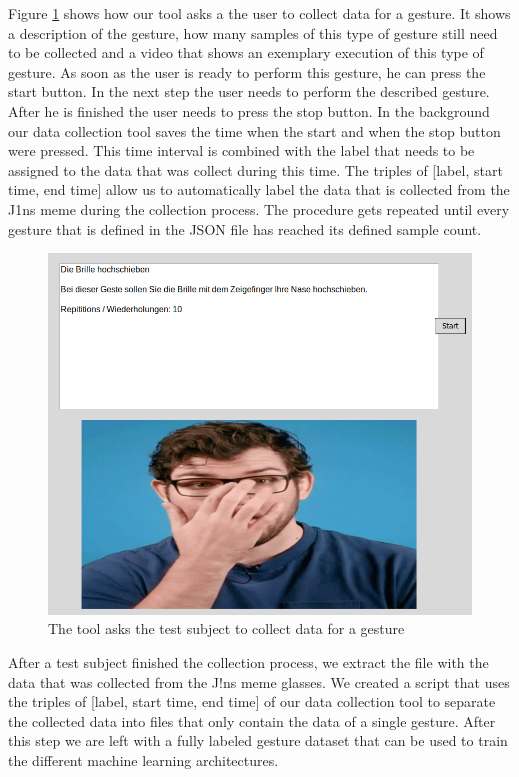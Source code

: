 \documentclass[runningheads]{llncs}
\begin{document}
Figure \ref{fig:gesturedatacollection} shows how our tool asks a the user to collect data for a gesture. It shows a description of the gesture, how many samples of this type of gesture still need to be collected and a video that shows an exemplary execution of this type of gesture. As soon as the user is ready to perform this gesture, he can press the start button. In the next step the user needs to perform the described gesture. After he is finished the user needs to press the stop button. In the background our data collection tool saves the time when the start and when the stop button were pressed. This time interval is combined with the label that needs to be assigned to the data that was collect during this time. The triples of [label, start time, end time] allow us to automatically label the data that is collected from the J1ns meme during the collection process. The procedure gets repeated until every gesture that is defined in the JSON file has reached its defined sample count.
\begin{center}
\begin{figure}
\centerline{\includegraphics[scale=0.3]{Gesture_Description.png}}
\caption{The tool asks the test subject to collect data for a gesture}
\label{fig:gesturedatacollection}
\end{figure}
\end{center}

After a test subject finished the collection process, we extract the file with the data that was collected from the J!ns meme glasses. We created a script that uses the triples of [label, start time, end time] of our data collection tool to separate the collected data into files that only contain the data of a single gesture. After this step we are left with a fully labeled gesture dataset that can be used to train the different machine learning architectures.
\end{document}
